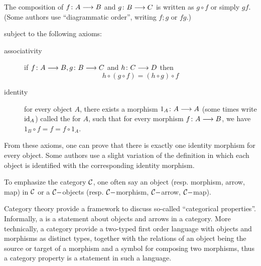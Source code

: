 \begin{defn}
\begin{itemize}
             The composition of $f\colon A \longrightarrow B$ and $g\colon B \longrightarrow C$ is written as $g\circ f$ or simply $gf$. (Some authors use ``diagrammatic order'', writing $f;g$ or $fg$.)
  \end{itemize}
  subject to the following axioms:
  \begin{description}
    \item[associativity] if $f\colon A \longrightarrow B, g\colon B \longrightarrow C$ and $h\colon C \longrightarrow D$ then
                                 \begin{equation*}
                                   h\circ(g\circ f) = (h\circ g)\circ f
                                 \end{equation*}
    \item[identity] for every object $A$, there exists a morphism $1_A\colon A \longrightarrow A$ (some times write $\operatorname{id}_A$) called the  for $A$, such that for every morphism $f\colon A \longrightarrow B$, we have $1_B \circ f = f = f \circ 1_A$.
  \end{description}
  From these axioms, one can prove that there is exactly one identity morphism for every object. Some authors use a slight variation of the definition in which each object is identified with the corresponding identity morphism.
  \end{defn}
  \begin{rem}
     To emphasize the category ${\cal C}$, one often say an object (resp. morphism, arrow, map) in ${\cal C}$ or a ${\cal C}-$objects (resp. ${\cal C}-$morphism, ${\cal C}-$arrow, ${\cal C}-$map).
  \end{rem}
\begin{rem}
  Category theory provide a framework to discuss so-called ``categorical properties''. Informally, a  is a statement about objects and arrows in a category. More technically, a category provide a two-typed first order language with objects and morphisms as distinct types, together with the relations of an object being the source or target of a morphism and a symbol for composing two morphisms, thus a category property is a statement in such a language.
\end{rem}

